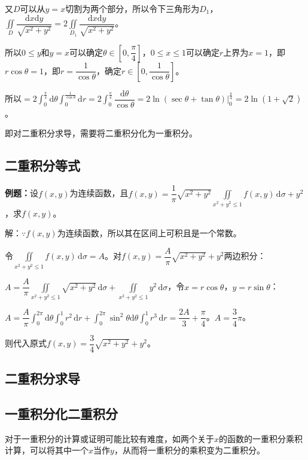 \documentclass[UTF8, 12pt]{ctexart}
\begin{document}
又$D$可以从$y=x$切割为两个部分，所以令下三角形为$D_1$，$\displaystyle{\iint\limits_D\dfrac{\textrm{d}x\textrm{d}y}{\sqrt{x^2+y^2}}}=2\displaystyle{\iint\limits_{D_1}\dfrac{\textrm{d}x\textrm{d}y}{\sqrt{x^2+y^2}}}$。

所以$0\leqslant y$和$y=x$可以确定$\theta\in\left[0,\dfrac{\pi}{4}\right]$，$0\leqslant x\leqslant1$可以确定$r$上界为$x=1$，即$r\cos\theta=1$，即$r=\dfrac{1}{\cos\theta}$，确定$r\in\left[0,\dfrac{1}{\cos\theta}\right]$。

所以$=2\int_0^{\frac{\pi}{4}}\textrm{d}\theta\int_0^{\frac{1}{\cos\theta}}\textrm{d}r=2\int_0^{\frac{\pi}{4}}\dfrac{\textrm{d}\theta}{\cos\theta}=2\ln(\sec\theta+\tan\theta)|_0^{\frac{\pi}{4}}=2\ln(1+\sqrt{2})$。

即对二重积分求导，需要将二重积分化为一重积分。

\subsection{二重积分等式}

\textbf{例题：}设$f(x,y)$为连续函数，且$f(x,y)=\dfrac{1}{\pi}\sqrt{x^2+y^2}\iint\limits_{x^2+y^2\leqslant1}f(x,y)\,\textrm{d}\sigma+y^2$，求$f(x,y)$。

解：$\because f(x,y)$为连续函数，所以其在区间上可积且是一个常数。

令$\iint\limits_{x^2+y^2\leqslant1}f(x,y)\,\textrm{d}\sigma=A$。对$f(x,y)=\dfrac{A}{\pi}\sqrt{x^2+y^2}+y^2$两边积分：

$A=\dfrac{A}{\pi}\iint\limits_{x^2+y^2\leqslant1}\sqrt{x^2+y^2}\,\textrm{d}\sigma+\iint\limits_{x^2+y^2\leqslant1}y^2\,\textrm{d}\sigma$，令$x=r\cos\theta$，$y=r\sin\theta$：

$A=\dfrac{A}{\pi}\int_0^{2\pi}\textrm{d}\theta\int_0^1r^2\,\textrm{d}r+\int_0^{2\pi}\sin^2\theta\textrm{d}\theta\int_0^1r^3\,\textrm{d}r=\dfrac{2A}{3}+\dfrac{\pi}{4}$。$A=\dfrac{3}{4}\pi$。

则代入原式$f(x,y)=\dfrac{3}{4}\sqrt{x^2+y^2}+y^2$。

\subsection{二重积分求导}

\subsection{一重积分化二重积分}

对于一重积分的计算或证明可能比较有难度，如两个关于$x$的函数的一重积分乘积计算，可以将其中一个$x$当作$y$，从而将一重积分的乘积变为二重积分。
\end{document}
